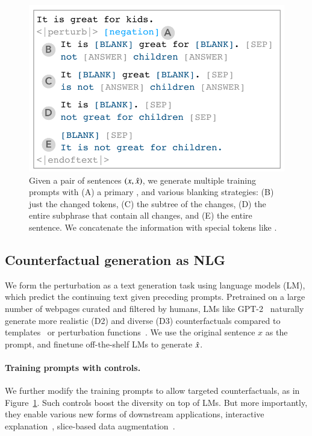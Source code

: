 \begin{figure}[t]
\centering
\includegraphics[width=1\columnwidth]{figures/blank}
\vspace{-15pt}
\caption{Given a pair of sentences $(x, \hat{x})$, we generate multiple training prompts with (A) a primary \tagstr, and various blanking strategies: (B) just the changed tokens, (C) the subtree of the changes, (D) the entire subphrase that contain all changes, and (E) the entire sentence.
We concatenate the information with special tokens like \perturbtoken.
}
\vspace{-10pt}
\label{fig:blank}
\end{figure}

\subsection{Counterfactual generation as NLG}

We form the perturbation as a text generation task using language models (LM), which predict the continuing text given preceding prompts.
Pretrained on a large number of webpages curated and filtered by humans, LMs like GPT-2~\cite{radford2019language} naturally generate more realistic (D2) and diverse (D3) counterfactuals compared to templates~\cite{ribeiro2018sear} or perturbation functions~\cite{wu2019errudite}.
We use the original sentence $x$ as the prompt, and finetune off-the-shelf LMs to generate $\hat{x}$.

\paragraph{Training prompts with controls.}
We further modify the training prompts to allow targeted counterfactuals, as in Figure~\ref{fig:blank}.
Such controls boost the diversity on top of LMs.
But more importantly, they enable various new forms of downstream applications, \eg interactive explanation~\cite{miller}, slice-based data augmentation~\cite{chen2019slice}.

